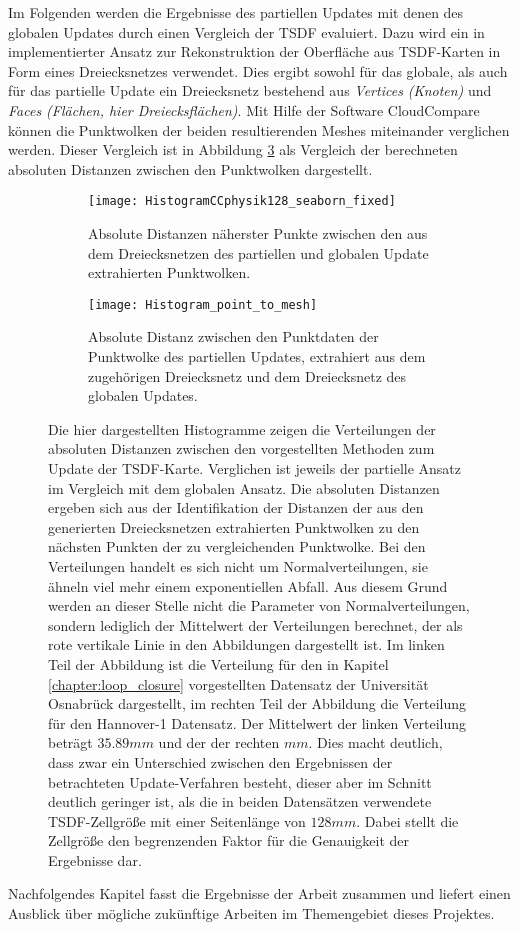 Im Folgenden werden die Ergebnisse des partiellen Updates mit denen des globalen Updates durch einen Vergleich der TSDF evaluiert. Dazu wird ein in \cite{HATSDF} implementierter Ansatz zur Rekonstruktion der Oberfläche aus TSDF-Karten in Form eines Dreiecksnetzes verwendet. Dies ergibt sowohl für das globale, als auch für das partielle Update ein Dreiecksnetz bestehend aus \emph{Vertices (Knoten)} und \emph{Faces (Flächen, hier Dreiecksflächen)}. Mit Hilfe der Software CloudCompare \cite{cloudcompare} können die Punktwolken der beiden resultierenden Meshes miteinander verglichen werden. Dieser Vergleich ist in Abbildung \ref{fig:CloudDifferences} als Vergleich der berechneten absoluten Distanzen zwischen den Punktwolken dargestellt.


\begin{figure}
	\centering
	\begin{subfigure}{.5\textwidth}
		 \centering
  		 \texttt{[image: HistogramCCphysik128\_seaborn\_fixed]}
  		 \centering \caption{Absolute Distanzen näherster Punkte zwischen den aus dem Dreiecksnetzen des partiellen und globalen Update extrahierten Punktwolken.}
  		 \label{fig:HistogramCCphysik128_seaborn}
	\end{subfigure}%
	\begin{subfigure}{.5\textwidth}
    	\centering
  		\texttt{[image: Histogram\_point\_to\_mesh]}
  		\centering \caption{Absolute Distanz zwischen den Punktdaten der Punktwolke des partiellen Updates, extrahiert aus dem zugehörigen Dreiecksnetz und dem Dreiecksnetz des globalen Updates.}
  		\label{fig:Histogram_point_to_mesh}
	\end{subfigure}
	\caption{Die hier dargestellten Histogramme zeigen die Verteilungen der absoluten Distanzen zwischen den vorgestellten Methoden zum Update der TSDF-Karte. Verglichen ist jeweils der partielle Ansatz im Vergleich mit dem globalen Ansatz. Die absoluten Distanzen ergeben sich aus der Identifikation der Distanzen der aus den generierten Dreiecksnetzen extrahierten Punktwolken zu den nächsten Punkten der zu vergleichenden Punktwolke. Bei den Verteilungen handelt es sich nicht um Normalverteilungen, sie ähneln viel mehr einem exponentiellen Abfall. Aus diesem Grund werden an dieser Stelle nicht die Parameter von Normalverteilungen, sondern lediglich der Mittelwert der Verteilungen berechnet, der als rote vertikale Linie in den Abbildungen dargestellt ist. Im linken Teil der Abbildung ist die Verteilung für den in Kapitel \ref{chapter:loop_closure} vorgestellten Datensatz der Universität Osnabrück dargestellt, im rechten Teil der Abbildung die Verteilung für den Hannover-1 Datensatz. Der Mittelwert der linken Verteilung beträgt $35.89mm$ und der der rechten $mm$. Dies macht deutlich, dass zwar ein Unterschied zwischen den Ergebnissen der betrachteten Update-Verfahren besteht, dieser aber im Schnitt deutlich geringer ist, als die in beiden Datensätzen verwendete TSDF-Zellgröße mit einer Seitenlänge von $128mm$. Dabei stellt die Zellgröße den begrenzenden Faktor für die Genauigkeit der Ergebnisse dar.}
	\label{fig:CloudDifferences}
\end{figure}



Nachfolgendes Kapitel fasst die Ergebnisse der Arbeit zusammen und liefert einen Ausblick über mögliche zukünftige Arbeiten im Themengebiet dieses Projektes.


